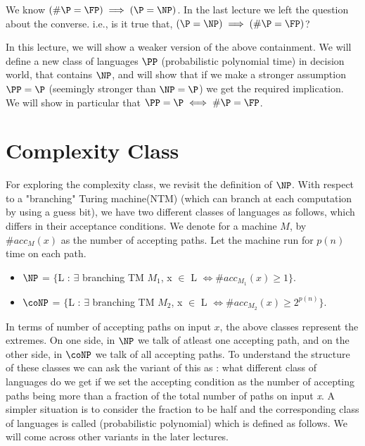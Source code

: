 \documentclass{report}
\begin{document}
\fi


We know $(\#\P = \FP) \implies (\P = \NP)$. In the last lecture we left the question about the converse.
i.e., is it true that, $(\P = \NP) \implies (\#\P = \FP)$?

In this lecture, we will show a weaker version of the above containment.
We will define a new class of languages $\PP$ (probabilistic polynomial time)
in decision world, that contains $\NP$, and will show that if we make a stronger assumption $\PP = \P$ (seemingly stronger than $\NP = \P$) we get the required implication.  We will show in particular that $\PP = \P \iff \#\P = \FP$.

\section{Complexity Class \PP}
For exploring the complexity class, we revisit the definition of $\NP$.
With respect to a "branching" Turing machine(NTM) (which can branch at each computation by using a guess bit), we have two different classes of languages as follows, which differs in their acceptance conditions. We denote for a machine $M$, by $\#acc_M(x)$ as the number of accepting paths. Let the machine run for $p(n)$ time on each path.
\begin{itemize}
\item $\NP$ = $\{$L : $\exists$ branching TM $M_1$, x $\in$ L $\iff \#acc_{M_1}(x) \ge 1 \}$.
\item $\coNP$ = $\{$L : $\exists$ branching TM $M_2$, x $\in$ L $\iff \#acc_{M_2}(x) \ge 2^{p(n)} \}$.
\end{itemize}

In terms of number of accepting paths on input $x$, the above classes
represent the extremes.  On one side, in $\NP$ we talk of atleast one
accepting path, and on the other side, in $\coNP$ we talk of all
accepting paths. To understand the structure of these classes we can
ask the variant of this as : what different class of languages do we
get if we set the accepting condition as the number of accepting paths
being more than a fraction of the total number of paths on input {\em
  x}. A simpler situation is to consider the fraction to be half and the
corresponding class of languages is called \PP (probabilistic
polynomial) which is defined as follows. We will come across other variants in
the later lectures.
\end{document}
